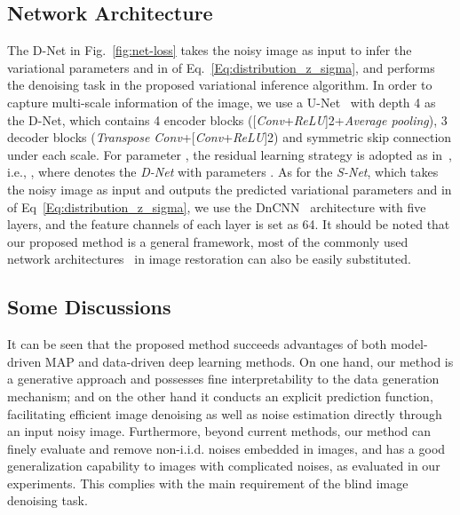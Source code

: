 \documentclass{article}
\begin{document}
\vspace{-2mm}\subsection{Network Architecture}\vspace{-2mm}
The D-Net in Fig.~\ref{fig:net-loss} takes the noisy image  as input to infer the variational
parameters  and  in  of Eq.~\eqref{Eq:distribution_z_sigma},
and performs the denoising task in the proposed variational inference algorithm. In order to capture
multi-scale information of the image, we use a U-Net~\cite{ronneberger2015u} with depth 4 as the D-Net,
which contains 4 encoder blocks ([\textit{Conv}+\textit{ReLU}]2+\textit{Average pooling}), 3 decoder
blocks (\textit{Transpose Conv}+[\textit{Conv}+\textit{ReLU}]2) and symmetric skip connection under
each scale. For parameter , the residual learning strategy is adopted as in~\cite{zhang2017beyond}, i.e.,
, where  denotes the \textit{D-Net} with parameters .
As for the \textit{S-Net}, which takes the noisy image  as input and outputs the predicted variational
parameters  and  in  of Eq~\eqref{Eq:distribution_z_sigma},
we use the DnCNN~\cite{zhang2017beyond} architecture with five layers, and the feature channels of each layer
is set as 64. It should be noted that our proposed method is a general framework, most of the commonly used network
architectures~\cite{zhang2018ffdnet,Ploetz2018,lefkimmiatis2018universal,zhang2018residual} in image restoration can
also be easily substituted.

\vspace{-2mm}\subsection{Some Discussions}\label{sec:discussion}\vspace{-2mm}
It can be seen that the proposed method succeeds advantages of both model-driven MAP and data-driven deep learning methods.
On one hand, our method is a generative approach and possesses fine interpretability to the data generation mechanism;
and on the other hand it conducts an explicit prediction function, facilitating efficient image denoising as well as
noise estimation directly through an input noisy image. Furthermore, beyond current methods, our method can finely
evaluate and remove non-i.i.d. noises embedded in images, and has a good generalization capability to images with
complicated noises, as evaluated in our experiments. This complies with the main requirement of the blind image
denoising task.
\end{document}
